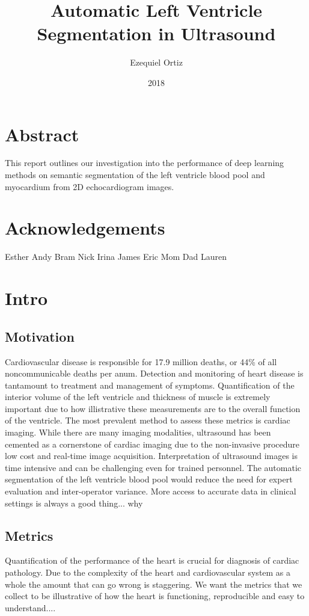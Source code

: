 \documentclass[12pt]{article}
\title{Automatic Left Ventricle Segmentation in Ultrasound}
\date{2018}
\author{Ezequiel Ortiz}
\begin{document}
\maketitle
{}
\newpage
\tableofcontents
\newpage
\doublespacing
{}

\section{Abstract}
This report outlines our investigation into the performance of deep learning methods on semantic segmentation of the left ventricle blood pool and myocardium from 2D echocardiogram images.

\section{Acknowledgements}
Esther
Andy
Bram
Nick
Irina
James
Eric
Mom
Dad
Lauren

\section{Intro}
\subsection{Motivation}
Cardiovascular disease is responsible for 17.9 million deaths, or 44\% of all noncommunicable deaths per anum\cite{who_world_health}.
Detection and monitoring of heart disease is tantamount to treatment and management of symptoms.%
Quantification of the interior volume of the left ventricle and thickness of muscle is extremely important due to how illistrative these measurements are to the overall function of the ventricle.\cite{ase_chamber_quant}
The most prevalent method to assess these metrics is cardiac imaging.
While there are many imaging modalities, ultrasound has been cemented as a cornerstone of cardiac imaging due to the non-invasive procedure low cost and real-time image acquisition.
Interpretation of ultrasound images is time intensive and can be challenging even for trained personnel.
The automatic segmentation of the left ventricle blood pool %
would reduce the need for expert evaluation and inter-operator variance.%
More access to accurate data in clinical settings is always a good thing... why

\subsection{Metrics}
Quantification of the performance of the heart is crucial for diagnosis of cardiac pathology.
Due to the complexity of the heart and cardiovascular system as a whole the amount that can go wrong is staggering.
We want the metrics that we collect to be illustrative of how the heart is functioning,
reproducible
and easy to understand....%
\end{document}
